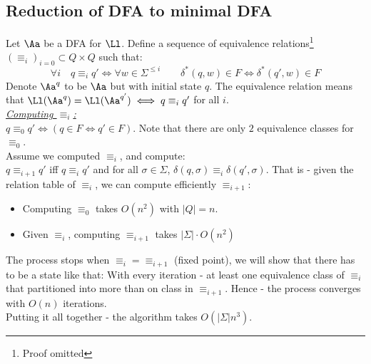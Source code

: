 \subsection{Reduction of DFA to minimal DFA}
\begin{blueBox}
	\begin{thm}
		Let $\Aa$ be a DFA for $\Ll$. Define a sequence of equivalence relations\footnote{Proof omitted} $(\equiv_i)_{i=0} \subset Q\times Q$ such that:
		\[
		\forall i\quad q\equiv_i q' \iff \forall w\in \Sigma^{\leq i} \qquad \delta^*(q,w)\in F \iff \delta^*(q',w) \in F
		\]
		Denote $\Aa^q$ to be $\Aa$ but with initial state $q$. The equivalence relation means that $\Ll(\Aa^q) = \Ll(\Aa^{q'}) \iff q\equiv_i q'$ for all $i$.\\
		
		\underline{\textit{Computing $\equiv_i$:}}\\
		$q\equiv_0 q' \iff (q\in F \iff q'\in F)$. Note that there are only $2$ equivalence classes for $\equiv_0$.\\
		Assume we computed $\equiv_i$, and compute:\\
		$q\equiv_{i+1} q'$ iff $q\equiv_i q'$ and for all $\sigma\in \Sigma$, $\delta(q,\sigma)\equiv_i \delta(q',\sigma)$. That is - given the relation table of $\equiv_i$, we can compute efficiently $\equiv_{i+1}$:
		\begin{itemize}
			\item Computing $\equiv_0$ takes $O(n^2)$ with $|Q| = n$.
			\item Given $\equiv_{i}$, computing $\equiv_{i+1}$ takes $|\Sigma|\cdot O(n^2)$
		\end{itemize}
		The process stops when $\equiv_{i} = \equiv_{i+1}$ (fixed point), we will show that there has to be a state like that: With every iteration - at least one equivalence class of $\equiv_{i}$ that partitioned into more than on class in $\equiv_{i+1}$. Hence - the process converges with $O(n)$ iterations.\\
		
		Putting it all together - the algorithm takes $O(|\Sigma|n^3)$.
	\end{thm}
\end{blueBox}
